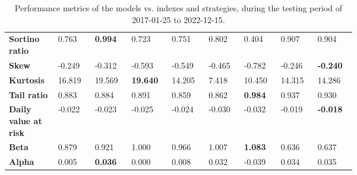 \documentclass[../xlapes02]{subfiles}
\begin{document}
\begin{table}[H]
{\begin{tabular}{*{9}{|m{0.075\linewidth}|}}
                          \bfseries Sortino ratio       & 0.763              & \color[HTML]{00F000} \bfseries 0.994 & 0.723                                 & 0.751          & 0.802 & 0.404 & 0.907 & 0.904 \\[0.4cm]
                          \bfseries Skew                & -0.249             & -0.312                               & -0.593                                & -0.549         & -0.465         & -0.782                               & -0.246                               & \color[HTML]{00F000} \bfseries -0.240 \\[0.4cm]
                          \bfseries Kurtosis            & 16.819             & 19.569                               & \color[HTML]{00F000} \bfseries 19.640 & 14.205         & 7.418 & 10.450 & 14.315 & 14.286 \\[0.4cm]
                          \bfseries Tail ratio          & 0.883              & 0.884                                & 0.891                                 & 0.859          & 0.862          & \color[HTML]{00F000} \bfseries 0.984 & 0.937 & 0.930 \\[0.4cm]
                          \bfseries Daily value at risk & -0.022             & -0.023                               & -0.025                                & -0.024         & -0.030         & -0.032                               & -0.019                               & \color[HTML]{00F000} \bfseries -0.018 \\[0.4cm]
                          \bfseries Beta                & 0.879              & 0.921                                & 1.000                                 & 0.966          & 1.007          & \color[HTML]{00F000} \bfseries 1.083 & 0.636 & 0.637 \\[0.4cm]
                          \bfseries Alpha               & 0.005              & \color[HTML]{00F000} \bfseries 0.036 & 0.000                                 & 0.008          & 0.032          & -0.039 & 0.034 & 0.035 \\[0.4cm]
                          \bottomrule
        \end{tabular}}
        \caption{Performance metrics of the models vs. indexes and strategies, during the testing period of 2017-01-25 to 2022-12-15.}
        \label{tab:stats}
    \end{table}
\end{document}
